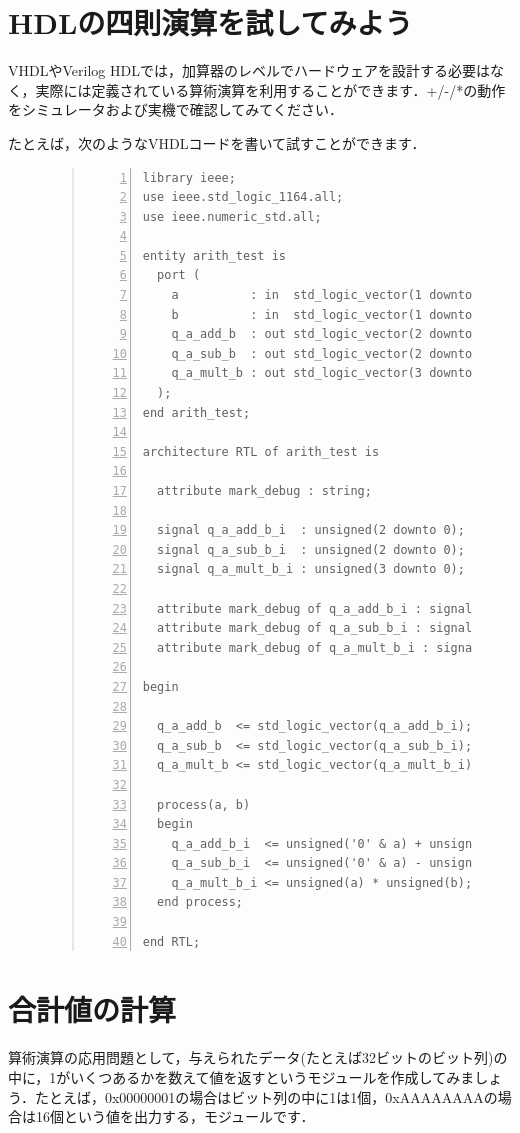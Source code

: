 \documentclass[a4paper,dvipdfmx]{jsarticle}
\begin{document}
\section{HDLの四則演算を試してみよう}
VHDLやVerilog HDLでは，加算器のレベルでハードウェアを設計する必要はなく，実際には定義されている算術演算を利用することができます．+/-/*の動作をシミュレータおよび実機で確認してみてください．

たとえば，次のようなVHDLコードを書いて試すことができます．
\begin{figure}[H]
\begin{quote}
\begin{Verbatim}[frame=single, numbers=left, baselinestretch=0.8]
library ieee;
use ieee.std_logic_1164.all;
use ieee.numeric_std.all;

entity arith_test is
  port (
    a          : in  std_logic_vector(1 downto 0);
    b          : in  std_logic_vector(1 downto 0);
    q_a_add_b  : out std_logic_vector(2 downto 0);
    q_a_sub_b  : out std_logic_vector(2 downto 0);
    q_a_mult_b : out std_logic_vector(3 downto 0)
  );
end arith_test;

architecture RTL of arith_test is
  
  attribute mark_debug : string;

  signal q_a_add_b_i  : unsigned(2 downto 0);
  signal q_a_sub_b_i  : unsigned(2 downto 0);
  signal q_a_mult_b_i : unsigned(3 downto 0);

  attribute mark_debug of q_a_add_b_i : signal is "true";
  attribute mark_debug of q_a_sub_b_i : signal is "true";
  attribute mark_debug of q_a_mult_b_i : signal is "true";

begin

  q_a_add_b  <= std_logic_vector(q_a_add_b_i);
  q_a_sub_b  <= std_logic_vector(q_a_sub_b_i);
  q_a_mult_b <= std_logic_vector(q_a_mult_b_i);

  process(a, b)
  begin
    q_a_add_b_i  <= unsigned('0' & a) + unsigned('0' & b);
    q_a_sub_b_i  <= unsigned('0' & a) - unsigned('0' & b);
    q_a_mult_b_i <= unsigned(a) * unsigned(b);
  end process;
  
end RTL;
\end{Verbatim}
\end{quote}
\end{figure}


\section{合計値の計算}
算術演算の応用問題として，与えられたデータ(たとえば32ビットのビット列)の中に，1がいくつあるかを数えて値を返すというモジュールを作成してみましょう．たとえば，0x00000001の場合はビット列の中に1は1個，0xAAAAAAAAの場合は16個という値を出力する，モジュールです．
\end{document}
